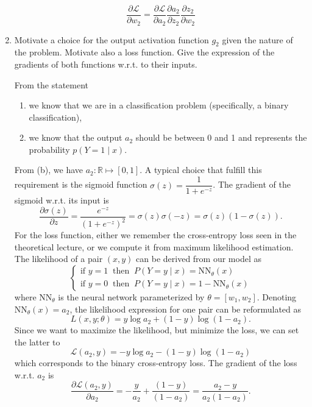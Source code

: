 \documentclass[11pt, a4paper]{article}
\begin{document}
\begin{enumerate}
    \begin{solution}
        $$
        \dfrac{\partial \mathcal{L}}{\partial w_2} = \dfrac{\partial \mathcal{L}}{\partial a_2} \dfrac{\partial a_2}{\partial z_2} \dfrac{\partial z_2}{\partial w_2} 
        $$
    \end{solution}

    \item Motivate a choice for the output activation function $g_2$ given the nature of the problem. Motivate also a loss function. Give the expression of the gradients of both functions w.r.t. to their inputs.

    \begin{solution}
        From the statement
        \begin{enumerate}
            \item we know that we are in a classification problem (specifically, a binary classification),
            \item we know that the output $a_2$ should be between 0 and 1 and represents the probability $p(Y = 1 \mid x)$.
        \end{enumerate}
        From (b), we have $a_2: \mathbb{R} \mapsto [0,1]$. A typical choice that fulfill this requirement is the sigmoid function $\sigma(z) = \dfrac{1}{1 + e^{-z}}$. The gradient of the sigmoid w.r.t. its input is 
        $$
        \dfrac{\partial \sigma(z)}{\partial z} = \dfrac{e^{-z}}{(1 + e^{-z})^2} = \sigma(z)\sigma(-z) = \sigma(z)(1-\sigma(z)).
        $$
        For the loss function, either we remember the cross-entropy loss seen in the theoretical lecture, or we compute it from maximum likelihood estimation.\\

        The likelihood of a pair $(x, y)$ can be derived from our model as
        $$
        \begin{cases}
            \text{if } y = 1\  \text{ then }\ P(Y = y \mid x) = \text{NN}_{\theta}(x)\\
            \text{if } y = 0\  \text{ then }\ P(Y = y \mid x) = 1 -\text{NN}_{\theta}(x)
        \end{cases}
        $$
        where $\text{NN}_{\theta}$ is the neural network parameterized by $\theta = [w_1, w_2]$. Denoting $\text{NN}_{\theta}(x) = a_2$, the likelihood expression for one pair can be reformulated as 
        $$
        L(x, y; \theta) = y\log a_2 + (1-y) \log (1 - a_2).
        $$
        Since we want to maximize the likelihood, but minimize the loss, we can set the latter to
        $$
        \mathcal{L}(a_2, y) = -y\log a_2 - (1-y) \log (1 - a_2)
        $$
        which corresponds to the binary cross-entropy loss. The gradient of the loss w.r.t. $a_2$ is
        $$
        \dfrac{\partial \mathcal{L}(a_2, y)}{\partial a_2} = -\dfrac{y}{a_2} + \dfrac{(1-y)}{(1-a_2)} = \dfrac{a_2 - y}{a_2(1- a_2)}.
        $$
    \end{solution}
    

\end{enumerate}
\end{document}
